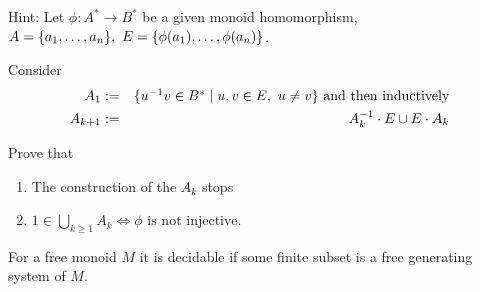 Hint: Let $\phi: A^* \to B^*$ be a given monoid homomorphism, $A =
\mbox{$\{a_1,\ldots,a_n\}$},\ E = \mbox{$\{\phi(a_1),\ldots,\phi(a_n)\}$}$.

Consider
\begin{eqnarray*}
A_1 &:=& \mbox{$\{u^{-1} v \in B^* \mid u, v \in E,\ u\neq v \}$}\text{ and then
inductively}\\
A_{k+1} &:=& A_k^{-1} \cdot E \cup E \cdot A_k
\end{eqnarray*}

Prove that
\begin{enumerate}
  \item The construction of the $A_k$ stops
  \item $1 \in \bigcup_{k \geq 1} A_k \iff \phi\text{ is not injective}$.
\end{enumerate}


\begin{corollary}
For a free monoid $M$ it is decidable if some finite subset is a free generating
system of $M$.
\end{corollary}
